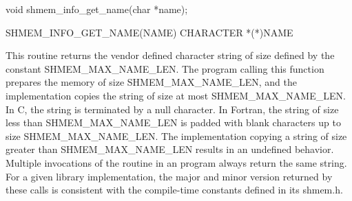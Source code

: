 \synC   %

void shmem_info_get_name(char *name); %

\synF   %

SHMEM_INFO_GET_NAME(NAME)   
CHARACTER *(*)NAME %

{
  This routine returns the vendor defined character string of size defined by the 
  constant SHMEM\_MAX\_NAME\_LEN. The program calling this function 
  prepares the memory of size SHMEM\_MAX\_NAME\_LEN, and the implementation copies the 
  string of size at most SHMEM\_MAX\_NAME\_LEN. In C, the string is terminated by a null character. 
  In Fortran, the string of size less than SHMEM\_MAX\_NAME\_LEN is padded with blank characters up to 
  size SHMEM\_MAX\_NAME\_LEN. The implementation copying a string of size greater than SHMEM\_MAX\_NAME\_LEN results 
  in an undefined behavior.
  Multiple invocations of the 
  routine in an \openshmem{} program always return the same string. 
  For a given library implementation, the major and minor version returned by these calls is consistent with the compile-time constants defined in its shmem.h.
}
{
}
\eAPI

